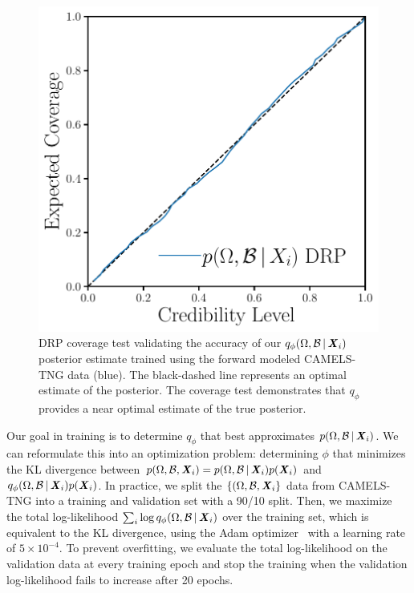 \begin{figure}[ht]
\vskip 0.2in
\begin{center}
    \centerline{\includegraphics[width=0.6\columnwidth]{figs/tarp_p_omega_x.pdf}}
    \caption{DRP coverage test validating the accuracy of our 
    $q_{\phi}(\Omega, \mathcal{B}\,|\, {\textbf{\textit{X}}_i})$ posterior estimate trained
    using the forward modeled CAMELS-TNG data (blue).
    The black-dashed line represents an optimal estimate of the posterior.
    The coverage test demonstrates that $q_\phi$ provides a near optimal
    estimate of the true posterior.
    }\label{fig:tarp}
\end{center}
\vskip -0.2in
\end{figure}

Our goal in training is to determine $q_\phi$ that best approximates 
$p(\Omega, \mathcal{B}\,|\, {\textbf{\textit{X}}_i})$. 
We can reformulate this into an optimization problem: determining $\phi$
that minimizes the KL divergence between 
$p(\Omega, \mathcal{B}, {\textbf{\textit{X}}_i}) = p(\Omega, \mathcal{B}\,|\, {\textbf{\textit{X}}_i})
 p({\textbf{\textit{X}}_i})$ and
$q_\phi(\Omega, \mathcal{B}\,|\, {\textbf{\textit{X}}_i}) p({\textbf{\textit{X}}_i})$.
In practice, we split the $\{(\Omega, \mathcal{B}, {\textbf{\textit{X}}_i}\}$ data from
CAMELS-TNG into a training and validation set with a 90/10 split.
Then, we maximize the total log-likelihood 
$\sum_i \log q_{\phi}(\Omega, \mathcal{B}\,|\, {\textbf{\textit{X}}_i})$ over the 
training set, which is equivalent to the KL divergence, using the {\sc Adam} 
optimizer~\citep{kingma2017} with a learning rate of $5\times10^{-4}$. 
To prevent overfitting, we evaluate the total log-likelihood on the validation
data at every training epoch and stop the training when the validation 
log-likelihood fails to increase after 20 epochs.  


